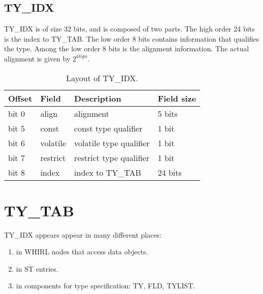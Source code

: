 \subsection{TY\_IDX}

%
TY\_IDX is of size 32 bits, and is composed of two parts. 
The high order 24 bits is the index to TY\_TAB. The low order 8 bits contains
information that qualifies the type. Among the low order 8 bits is the
alignment information. The actual alignment is given by
$2^{align}$. 

\begin{table}[h]
\centering
\caption{Layout of TY\_IDX.\protect\footnotemark}
\label{Table_14} 
\begin{tabular}{|l|l|l|l|}\hline
Offset & Field & Description &Field size\\\hline 
bit 0 & align & alignment & 5 bits\\\hline 
bit 5 & const & const type qualifier & 1 bit \\\hline
bit 6 & volatile & volatile type qualifier & 1 bit\\\hline
bit 7 & restrict & restrict type qualifier & 1 bit \\\hline
bit 8 & index & index to
\index{TY\_TAB}%
TY\_TAB & 24 bits\\\hline
\end{tabular}
\end{table}


\section{TY\_TAB}


%
TY\_IDX appears appear in many different places:

\begin{enumerate}

\item in WHIRL nodes that access data objects. 
\item in
%
ST entries.
\item in components for type specification: TY, FLD, TYLIST.
\end{enumerate}

